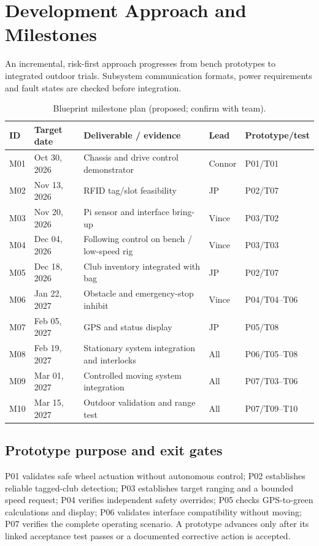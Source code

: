 \section{Development Approach and Milestones}
An incremental, risk-first approach progresses from bench prototypes to integrated outdoor trials. Subsystem communication formats, power requirements and fault states are checked before integration.
\begin{table}[ht]\centering\scriptsize\caption{Blueprint milestone plan (proposed; confirm with team).}\begin{tabularx}{\linewidth}{p{.09\linewidth}p{.17\linewidth}X p{.12\linewidth}p{.13\linewidth}}\toprule ID & Target date & Deliverable / evidence & Lead & Prototype/test\\\midrule
M01 & Oct 30, 2026 & Chassis and drive control demonstrator & Connor & P01/T01\\
M02 & Nov 13, 2026 & RFID tag/slot feasibility & JP & P02/T07\\
M03 & Nov 20, 2026 & Pi sensor and interface bring-up & Vince & P03/T02\\
M04 & Dec 04, 2026 & Following control on bench / low-speed rig & Vince & P03/T03\\
M05 & Dec 18, 2026 & Club inventory integrated with bag & JP & P02/T07\\
M06 & Jan 22, 2027 & Obstacle and emergency-stop inhibit & Vince & P04/T04--T06\\
M07 & Feb 05, 2027 & GPS and status display & JP & P05/T08\\
M08 & Feb 19, 2027 & Stationary system integration and interlocks & All & P06/T05--T08\\
M09 & Mar 01, 2027 & Controlled moving system integration & All & P07/T03--T06\\
M10 & Mar 15, 2027 & Outdoor validation and range test & All & P07/T09--T10\\
\bottomrule\end{tabularx}\end{table}
\subsection{Prototype purpose and exit gates}
P01 validates safe wheel actuation without autonomous control; P02 establishes reliable tagged-club detection; P03 establishes target ranging and a bounded speed request; P04 verifies independent safety overrides; P05 checks GPS-to-green calculations and display; P06 validates interface compatibility without moving; P07 verifies the complete operating scenario. A prototype advances only after its linked acceptance test passes or a documented corrective action is accepted.
